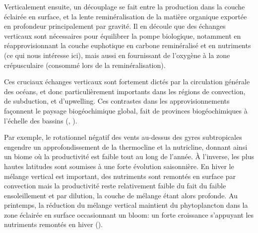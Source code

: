 Verticalement ensuite, un découplage se fait entre la production dans la couche éclairée en surface, et la lente reminéralisation de la matière organique exportée en profondeur principalement par gravité.
Il en découle que des échanges verticaux sont nécessaires pour équilibrer la pompe biologique, notamment en réapprovisionnant la couche euphotique en carbone reminéralisé et en nutriments (ce qui nous intéresse ici), mais aussi en fournissant de l’oxygène à la zone crépusculaire (consommé lors de la reminéralisation).


Ces cruciaux échanges verticaux sont fortement dictés par la circulation générale des océans, et donc particulièrement importants dans les régions de convection, de subduction, et d'upwelling.
Ces contrastes dans les approvisionnements façonnent le paysage biogéochimique global, fait de provinces biogéochimiques à l'échelle des bassins (, \cite{longhurst_2007,vichi_2011a,williams_2011,bock_2022}).

Par exemple, le rotationnel négatif des vents au-dessus des gyres subtropicales engendre un approfondissement de la thermocline et la nutricline, donnant ainsi un biome où la productivité est faible tout au long de l'année.
À l'inverse, les plus hautes latitudes  sont soumises à une forte évolution saisonnière.
En hiver le mélange vertical est important, des nutriments sont remontés en surface par convection mais la productivité reste relativement faible du fait du faible ensoleillement et par dilution, la couche de mélange étant alors profonde.
Au printemps, la réduction du mélange vertical maintient du phytoplancton dans la zone éclairée en surface occasionnant un bloom: un forte croissance s'appuyant les nutriments remontés en hiver (\cite{wilson_2005,siegel_2002,taylor_2011a,williams_2011}).

\begin{figure}
  \centering
  \label{fig:nutricline-globale}
\end{figure}

